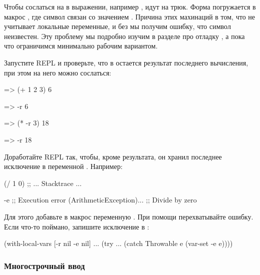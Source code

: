 Чтобы сослаться на  в выражении, например , идут на трюк. Форма  погружается в макрос , где символ \mbox{} связан со значением  . Причина этих махинаций в том, что  не учитывает локальные переменные, и без  мы получим ошибку, что символ  неизвестен. Эту проблему мы подробно изучим в разделе про отладку , а пока что ограничимся минимально рабочим вариантом.

Запустите REPL и проверьте, что в  остается результат последнего вычисления, при этом на него можно сослаться:

\begin{english}
  \begin{clojure}
=> (+ 1 2 3)
6

=> -r
6

=> (* -r 3)
18

=> -r
18
  \end{clojure}
\end{english}

Доработайте REPL так, чтобы, кроме результата, он хранил последнее исключение в переменной . Например:

\begin{english}
  \begin{clojure}
(/ 1 0)
;; ... Stacktrace ...

-e
;; Execution error (ArithmeticException)...
;; Divide by zero
  \end{clojure}
\end{english}


Для этого добавьте в макрос  переменную \code{[-e nil]}. При помощи  перехватывайте ошибку. Если что-то поймано, запишите исключение в :

\begin{english}
  \begin{clojure}
(with-local-vars [-r nil -e nil]
  ...
  (try
    ...
    (catch Throwable e
      (var-set -e e))))
  \end{clojure}
\end{english}

\subsubsection{Многострочный ввод}


